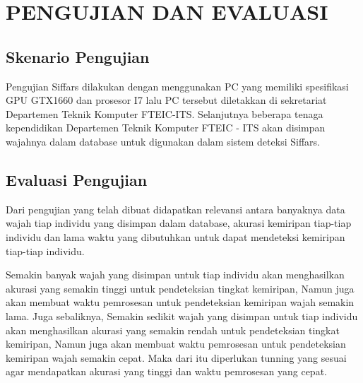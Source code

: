 \chapter{PENGUJIAN DAN EVALUASI}


\section{Skenario Pengujian}

Pengujian Siffars dilakukan dengan menggunakan PC yang memiliki spesifikasi GPU GTX1660 dan prosesor I7 lalu PC
tersebut diletakkan di sekretariat Departemen Teknik Komputer FTEIC-ITS. Selanjutnya beberapa tenaga kependidikan
Departemen Teknik Komputer FTEIC - ITS akan disimpan wajahnya dalam database untuk digunakan dalam sistem deteksi Siffars.

\section{Evaluasi Pengujian}

Dari pengujian yang telah dibuat didapatkan relevansi antara banyaknya data wajah tiap individu yang disimpan dalam database,
akurasi kemiripan tiap-tiap individu dan lama waktu yang dibutuhkan untuk dapat mendeteksi kemiripan tiap-tiap individu.

Semakin banyak wajah yang disimpan untuk tiap individu akan menghasilkan akurasi yang semakin tinggi untuk pendeteksian tingkat kemiripan,
Namun juga akan membuat waktu pemrosesan untuk pendeteksian kemiripan wajah semakin lama. Juga sebaliknya,
Semakin sedikit wajah yang disimpan untuk tiap individu akan menghasilkan akurasi yang semakin rendah untuk pendeteksian tingkat kemiripan,
Namun juga akan membuat waktu pemrosesan untuk pendeteksian kemiripan wajah semakin cepat. Maka dari itu diperlukan
tunning yang sesuai agar mendapatkan akurasi yang tinggi dan waktu pemrosesan yang cepat.

